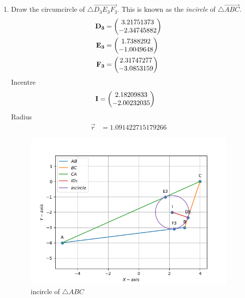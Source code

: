 \documentclass[10pt]{book}
\begin{document}
\begin{enumerate}[label=\thesection.\arabic*.,ref=\thesection.\theenumi]
\item Draw the circumcircle of $\triangle \vec{D_3E_3F_3}$.  This is known as the {\em incircle} of $\triangle \vec{ABC}$. \\
\solution 
\begin{align}
    \mathbf{D_3} &= \begin{pmatrix}3.21751373 \\ -2.34745882\end{pmatrix} \\
    \mathbf{E_3} &= \begin{pmatrix}1.7388292 \\ -1.0049648\end{pmatrix} \\
    \mathbf{F_3} &= \begin{pmatrix}2.31747277 \\ -3.0853159 \end{pmatrix} 
\end{align}
Incentre 
\begin{align}
   \mathbf{I}&=\begin{pmatrix}2.18209833 \\ -2.00232035\end{pmatrix}
\end{align}
Radius
\begin{align}
 \vec{r} &= 1.091422715179266
\end{align}
\begin{figure}[H]
    \centering
    \includegraphics{figs/Incircle.png}
    \caption{incircle of $\triangle ABC$ }
    \label{fig:Ang_bisect3}
\end{figure}



\end{enumerate}
\end{document}
